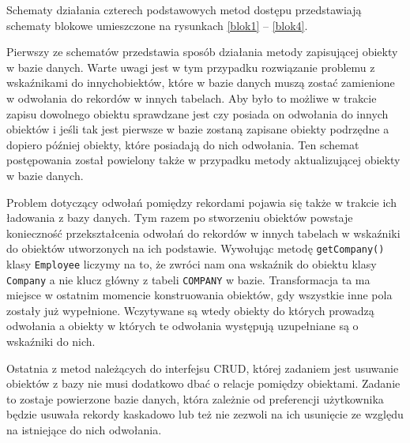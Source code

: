 \documentclass[12pt]{report}
\begin{document}
Schematy działania czterech podstawowych metod dostępu przedstawiają schematy blokowe umieszczone na rysunkach \ref{blok1} -- \ref{blok4}.

Pierwszy ze schematów przedstawia sposób działania metody zapisującej \linebreak obiekty w bazie danych. Warte uwagi jest w tym przypadku rozwiązanie problemu z wskaźnikami 
do innychobiektów, które w bazie danych muszą zostać zamienione w odwołania do rekordów w innych tabelach. Aby było to możliwe w trakcie zapisu dowolnego obiektu sprawdzane 
jest czy posiada on odwołania do innych obiektów i jeśli tak jest pierwsze w bazie zostaną zapisane obiekty podrzędne a dopiero później obiekty, które posiadają do nich odwołania.
Ten schemat postępowania został powielony także w przypadku metody aktualizującej obiekty w bazie danych.

Problem dotyczący odwołań pomiędzy rekordami pojawia się także w trakcie ich ładowania z bazy danych. Tym razem po stworzeniu obiektów powstaje konieczność przekształcenia
odwołań do rekordów w innych tabelach w wskaźniki do obiektów utworzonych na ich podstawie. Wywołując metodę {\tt getCompany()} klasy {\tt Employee} liczymy na to, że zwróci
nam ona wskaźnik do obiektu klasy {\tt Company} a nie klucz główny z tabeli {\tt COMPANY} w bazie. Transformacja ta ma miejsce w ostatnim momencie konstruowania obiektów, gdy
wszystkie inne pola zostały już wypełnione. Wczytywane są wtedy obiekty do których prowadzą odwołania a obiekty w których te odwołania występują uzupełniane są o wskaźniki
do nich.

Ostatnia z metod należących do interfejsu CRUD, której zadaniem jest usuwanie obiektów z bazy nie musi dodatkowo dbać o relacje pomiędzy obiektami. Zadanie to zostaje powierzone
bazie danych, która zależnie od preferencji użytkownika będzie usuwała rekordy kaskadowo lub też nie zezwoli na ich usunięcie ze względu na istniejące do nich odwołania. 
\end{document}

